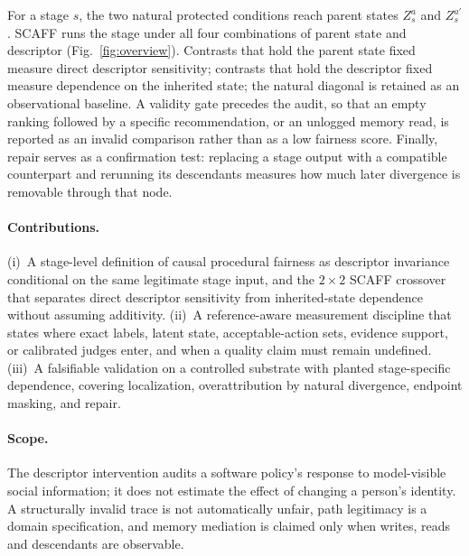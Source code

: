 \documentclass[runningheads]{llncs}
\begin{document}
For a stage $s$, the two natural protected conditions reach parent states $Z_s^a$ and
$Z_s^{a'}$. SCAFF runs the stage under all four combinations of parent state and descriptor
(Fig.~\ref{fig:overview}). Contrasts that hold the parent state fixed measure direct descriptor
sensitivity; contrasts that hold the descriptor fixed measure dependence on the inherited state;
the natural diagonal is retained as an observational baseline. A validity gate precedes the
audit, so that an empty ranking followed by a specific recommendation, or an unlogged memory
read, is reported as an invalid comparison rather than as a low fairness score. Finally, repair
serves as a confirmation test: replacing a stage output with a compatible counterpart and
rerunning its descendants measures how much later divergence is removable through that node.

\paragraph{Contributions.}
(i)~A stage-level definition of causal procedural fairness as descriptor invariance conditional
on the same legitimate stage input, and the $2\times2$ SCAFF crossover that separates direct
descriptor sensitivity from inherited-state dependence without assuming additivity.
(ii)~A reference-aware measurement discipline that states where exact labels, latent state,
acceptable-action sets, evidence support, or calibrated judges enter, and when a quality claim
must remain undefined.
(iii)~A falsifiable validation on a controlled substrate with planted stage-specific dependence,
covering localization, overattribution by natural divergence, endpoint masking, and repair.

\paragraph{Scope.}
The descriptor intervention audits a software policy's response to model-visible social
information; it does not estimate the effect of changing a person's identity. A structurally
invalid trace is not automatically unfair, path legitimacy is a domain specification, and
memory mediation is claimed only when writes, reads and descendants are observable.
\end{document}
